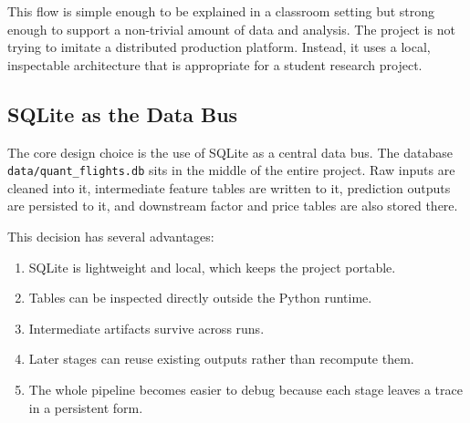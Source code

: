 \documentclass[11pt,a4paper]{article}
\begin{document}
\begin{center}
\end{center}

This flow is simple enough to be explained in a classroom setting but strong
enough to support a non-trivial amount of data and analysis. The project is not
trying to imitate a distributed production platform. Instead, it uses a local,
inspectable architecture that is appropriate for a student research project.

\subsection{SQLite as the Data Bus}

The core design choice is the use of SQLite as a central data bus. The database
\texttt{data/quant\_flights.db} sits in the middle of the entire project. Raw
inputs are cleaned into it, intermediate feature tables are written to it,
prediction outputs are persisted to it, and downstream factor and price tables
are also stored there.

This decision has several advantages:

\begin{enumerate}[leftmargin=*, label=(\arabic*)]
  \item SQLite is lightweight and local, which keeps the project portable.
  \item Tables can be inspected directly outside the Python runtime.
  \item Intermediate artifacts survive across runs.
  \item Later stages can reuse existing outputs rather than recompute them.
  \item The whole pipeline becomes easier to debug because each stage leaves a
  trace in a persistent form.
\end{enumerate}
\end{document}
